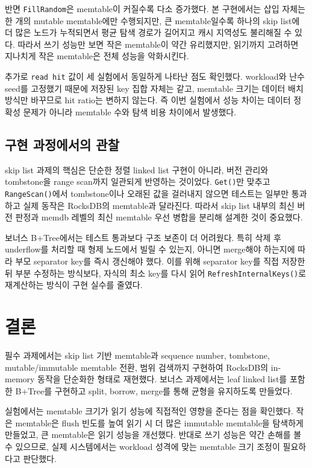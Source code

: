 \documentclass[11pt,a4paper]{article}
\begin{document}
반면 \texttt{FillRandom}은 memtable이 커질수록 다소 증가했다. 본 구현에서는 삽입 자체는 한 개의 mutable memtable에만 수행되지만, 큰 memtable일수록 하나의 skip list에 더 많은 노드가 누적되면서 평균 탐색 경로가 길어지고 캐시 지역성도 불리해질 수 있다. 따라서 쓰기 성능만 보면 작은 memtable이 약간 유리했지만, 읽기까지 고려하면 지나치게 작은 memtable은 전체 성능을 악화시킨다.

추가로 \texttt{read hit} 값이 세 실험에서 동일하게 나타난 점도 확인했다. workload와 난수 seed를 고정했기 때문에 저장된 key 집합 자체는 같고, memtable 크기는 데이터 배치 방식만 바꾸므로 hit ratio는 변하지 않는다. 즉 이번 실험에서 성능 차이는 데이터 정확성 문제가 아니라 memtable 수와 탐색 비용 차이에서 발생했다.

\subsection{구현 과정에서의 관찰}
skip list 과제의 핵심은 단순한 정렬 linked list 구현이 아니라, 버전 관리와 tombstone을 range scan까지 일관되게 반영하는 것이었다. \texttt{Get()}만 맞추고 \texttt{RangeScan()}에서 tombstone이나 오래된 값을 걸러내지 않으면 테스트는 일부만 통과하고 실제 동작은 RocksDB의 memtable과 달라진다. 따라서 skip list 내부의 최신 버전 판정과 memdb 레벨의 최신 memtable 우선 병합을 분리해 설계한 것이 중요했다.

보너스 B+Tree에서는 테스트 통과보다 구조 보존이 더 어려웠다. 특히 삭제 후 underflow를 처리할 때 형제 노드에서 빌릴 수 있는지, 아니면 merge해야 하는지에 따라 부모 separator key를 즉시 갱신해야 했다. 이를 위해 separator key를 직접 저장한 뒤 부분 수정하는 방식보다, 자식의 최소 key를 다시 읽어 \texttt{RefreshInternalKeys()}로 재계산하는 방식이 구현 실수를 줄였다.

\section{결론}
필수 과제에서는 skip list 기반 memtable과 sequence number, tombstone, mutable/immutable memtable 전환, 범위 검색까지 구현하여 RocksDB의 in-memory 동작을 단순화한 형태로 재현했다. 보너스 과제에서는 leaf linked list를 포함한 B+Tree를 구현하고 split, borrow, merge를 통해 균형을 유지하도록 만들었다.

실험에서는 memtable 크기가 읽기 성능에 직접적인 영향을 준다는 점을 확인했다. 작은 memtable은 flush 빈도를 높여 읽기 시 더 많은 immutable memtable을 탐색하게 만들었고, 큰 memtable은 읽기 성능을 개선했다. 반대로 쓰기 성능은 약간 손해를 볼 수 있으므로, 실제 시스템에서는 workload 성격에 맞는 memtable 크기 조정이 필요하다고 판단했다.
\end{document}
